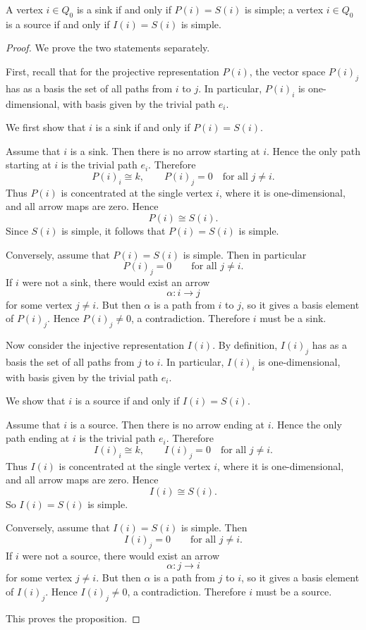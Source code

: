 \documentclass[11pt, a4paper]{report}
\begin{document}
\begin{proposition}
    A vertex \(i \in Q_0\) is a sink if and only if \(P(i)=S(i)\) is simple; a vertex
    \(i \in Q_0\) is a source if and only if \(I(i)=S(i)\) is simple.
    \end{proposition}

    \begin{proof}
    We prove the two statements separately.

    First, recall that for the projective representation \(P(i)\), the vector space
    \(P(i)_j\) has as a basis the set of all paths from \(i\) to \(j\). In particular,
    \(P(i)_i\) is one-dimensional, with basis given by the trivial path \(e_i\).

    We first show that \(i\) is a sink if and only if \(P(i)=S(i)\).

    Assume that \(i\) is a sink. Then there is no arrow starting at \(i\). Hence the only
    path starting at \(i\) is the trivial path \(e_i\). Therefore
    \[
    P(i)_i \cong k,
    \qquad
    P(i)_j=0 \quad \text{for all } j\neq i.
    \]
    Thus \(P(i)\) is concentrated at the single vertex \(i\), where it is one-dimensional,
    and all arrow maps are zero. Hence
    \[
    P(i)\cong S(i).
    \]
    Since \(S(i)\) is simple, it follows that \(P(i)=S(i)\) is simple.

    Conversely, assume that \(P(i)=S(i)\) is simple. Then in particular
    \[
    P(i)_j=0 \qquad \text{for all } j\neq i.
    \]
    If \(i\) were not a sink, there would exist an arrow
    \[
    \alpha:i\to j
    \]
    for some vertex \(j\neq i\). But then \(\alpha\) is a path from \(i\) to \(j\), so it
    gives a basis element of \(P(i)_j\). Hence \(P(i)_j\neq 0\), a contradiction.
    Therefore \(i\) must be a sink.

    Now consider the injective representation \(I(i)\). By definition, \(I(i)_j\) has as a
    basis the set of all paths from \(j\) to \(i\). In particular, \(I(i)_i\) is
    one-dimensional, with basis given by the trivial path \(e_i\).

    We show that \(i\) is a source if and only if \(I(i)=S(i)\).

    Assume that \(i\) is a source. Then there is no arrow ending at \(i\). Hence the only
    path ending at \(i\) is the trivial path \(e_i\). Therefore
    \[
    I(i)_i \cong k,
    \qquad
    I(i)_j=0 \quad \text{for all } j\neq i.
    \]
    Thus \(I(i)\) is concentrated at the single vertex \(i\), where it is one-dimensional,
    and all arrow maps are zero. Hence
    \[
    I(i)\cong S(i).
    \]
    So \(I(i)=S(i)\) is simple.

    Conversely, assume that \(I(i)=S(i)\) is simple. Then
    \[
    I(i)_j=0 \qquad \text{for all } j\neq i.
    \]
    If \(i\) were not a source, there would exist an arrow
    \[
    \alpha:j\to i
    \]
    for some vertex \(j\neq i\). But then \(\alpha\) is a path from \(j\) to \(i\), so it
    gives a basis element of \(I(i)_j\). Hence \(I(i)_j\neq 0\), a contradiction.
    Therefore \(i\) must be a source.

    This proves the proposition.
    \end{proof}
\end{document}
